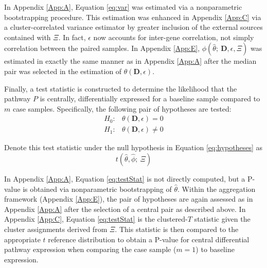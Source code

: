 In Appendix \ref{App:A}, Equation \ref{eq:var} was estimated via a nonparametric bootstrapping procedure. This estimation was enhanced in Appendix \ref{App:C} via a cluster-correlated variance estimator by greater inclusion of the external sources contained with $\Xi$. In fact, $\epsilon$ now accounts for inter-gene correlation, not simply correlation between the paired samples. In Appendix \ref{App:E}, $\phi(\hat{\theta};~\mathbf{D},\epsilon,\Xi)$ was estimated in exactly the same manner as in Appendix \ref{App:A} after the median pair was selected in the estimation of $\theta (\mathbf{D}, \epsilon)$.

Finally, a test statistic is constructed to determine the likelihood that the pathway $P$ is centrally, differentially expressed for a baseline sample compared to $m$ case samples. Specifically, the following pair of hypotheses are tested:
\begin{equation}
  \label{eq:hypotheses}
\begin{array}{rl} \tag{3}
  H_{0}: & \theta (\mathbf{D}, \epsilon) = 0 \\
  H_{1}: & \theta (\mathbf{D}, \epsilon) \neq 0
\end{array}
\end{equation}

\noindent \noindent Denote this test statistic under the null hypothesis in Equation \ref{eq:hypotheses} as
\begin{equation}
\label{eq:testStat}
t(\hat{\theta},\hat{\phi};~\Xi) \tag{4}
\end{equation}

In Appendix \ref{App:A}, Equation \ref{eq:testStat} is not directly computed, but a P-value is obtained via nonparametric bootstrapping of $\hat{\theta}$. Within the aggregation framework (Appendix \ref{App:E}), the pair of hypotheses are again assessed as in Appendix \ref{App:A} after the selection of a central pair as described above. In Appendix \ref{App:C}, Equation \ref{eq:testStat} is the clustered-$T$ statistic given the cluster assignments derived from $\Xi$. This statistic is then compared to the appropriate $t$ reference distribution to obtain a P-value for central differential pathway expression when comparing the case sample ($m=1$) to baseline expression. 
